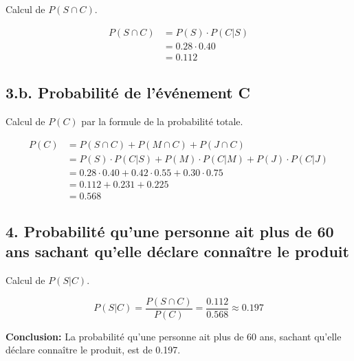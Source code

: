 \documentclass{exam}
\begin{document}
\begin{solution}
Calcul de \( P(S \cap C) \).

\begin{align*}
P(S \cap C) &= P(S) \cdot P(C|S) \\
&= 0.28 \cdot 0.40 \\
&= 0.112
\end{align*}

\subsection*{3.b. Probabilité de l'événement C}

Calcul de \( P(C) \) par la formule de la probabilité totale.

\begin{align*}
P(C) &= P(S \cap C) + P(M \cap C) + P(J \cap C) \\
&= P(S) \cdot P(C|S) + P(M) \cdot P(C|M) + P(J) \cdot P(C|J) \\
&= 0.28 \cdot 0.40 + 0.42 \cdot 0.55 + 0.30 \cdot 0.75 \\
&= 0.112 + 0.231 + 0.225 \\
&= 0.568
\end{align*}

\subsection*{4. Probabilité qu'une personne ait plus de 60 ans sachant qu'elle déclare connaître le produit}

Calcul de \( P(S|C) \).

\[
P(S|C) = \frac{P(S \cap C)}{P(C)} = \frac{0.112}{0.568} \approx 0.197
\]

\textbf{Conclusion:} La probabilité qu'une personne ait plus de 60 ans, sachant qu'elle déclare connaître le produit, est de 0.197.

\end{solution}
\end{document}
